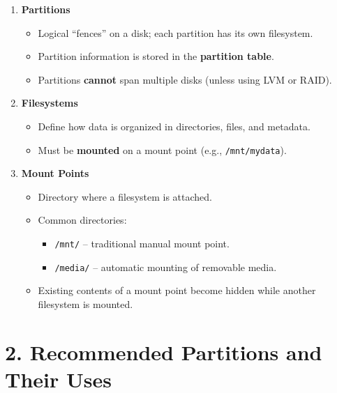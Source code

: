 \documentclass[a4paper]{report}
\begin{document}
\begin{enumerate}
    \item \textbf{Partitions}
    \begin{itemize}
        \item Logical “fences” on a disk; each partition has its own filesystem.
        \item Partition information is stored in the \textbf{partition table}.
        \item Partitions \textbf{cannot} span multiple disks (unless using LVM or RAID).
    \end{itemize}

    \item \textbf{Filesystems}
    \begin{itemize}
        \item Define how data is organized in directories, files, and metadata.
        \item Must be \textbf{mounted} on a mount point (e.g., \texttt{/mnt/mydata}).
    \end{itemize}

    \item \textbf{Mount Points}
    \begin{itemize}
        \item Directory where a filesystem is attached.
        \item Common directories:
        \begin{itemize}
            \item \texttt{/mnt/} – traditional manual mount point.
            \item \texttt{/media/} – automatic mounting of removable media.
        \end{itemize}
        \item Existing contents of a mount point become hidden while another filesystem is mounted.
    \end{itemize}
\end{enumerate}

\section*{2. Recommended Partitions and Their Uses}
\end{document}
